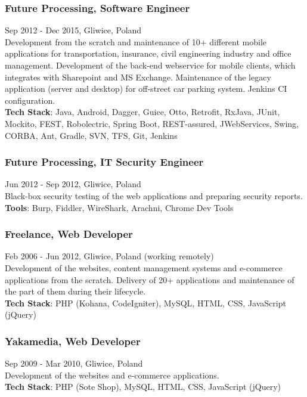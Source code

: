 \documentclass{article}
\begin{document}
      \subsubsection*{Future Processing, Software Engineer}
      Sep 2012 - Dec 2015, Gliwice, Poland\\[0.3em]
      Development from the scratch and maintenance of 10+ different mobile applications for transportation, 
      insurance, civil engineering industry and office management. 
      Development of the back-end webservice for mobile clients, which integrates with Sharepoint and MS Exchange. 
      Maintenance of the legacy application (server and desktop) for off-street car parking system. 
      Jenkins CI configuration.\\
      \textbf{Tech Stack}: Java, Android, Dagger, Guice, Otto, Retrofit, RxJava, 
      JUnit, Mockito, FEST, Robolectric, Spring Boot, REST-assured, JWebServices, 
      Swing, CORBA, Ant, Gradle, SVN, TFS, Git, Jenkins

      \subsubsection*{Future Processing, IT Security Engineer}
      Jun 2012 - Sep 2012, Gliwice, Poland\\[0.3em]
      Black-box security testing of the web applications and preparing security reports.\\
      \textbf{Tools}: Burp, Fiddler, WireShark, Arachni, Chrome Dev Tools

      \subsubsection*{Freelance, Web Developer}
      Feb 2006 - Jun 2012, Gliwice, Poland (working remotely)\\[0.3em]
      Development of the websites, content management systems and e-commerce applications from the scratch.
      Delivery of 20+ applications and maintenance of the part of them during their lifecycle.\\
      \textbf{Tech Stack}: PHP (Kohana, CodeIgniter), MySQL, HTML, CSS, JavaScript (jQuery)

      \subsubsection*{Yakamedia, Web Developer}
      Sep 2009 - Mar 2010, Gliwice, Poland\\[0.3em]
      Development of the websites and e-commerce applications.\\
      \textbf{Tech Stack}: PHP (Sote Shop), MySQL, HTML, CSS, JavaScript (jQuery)
\end{document}
